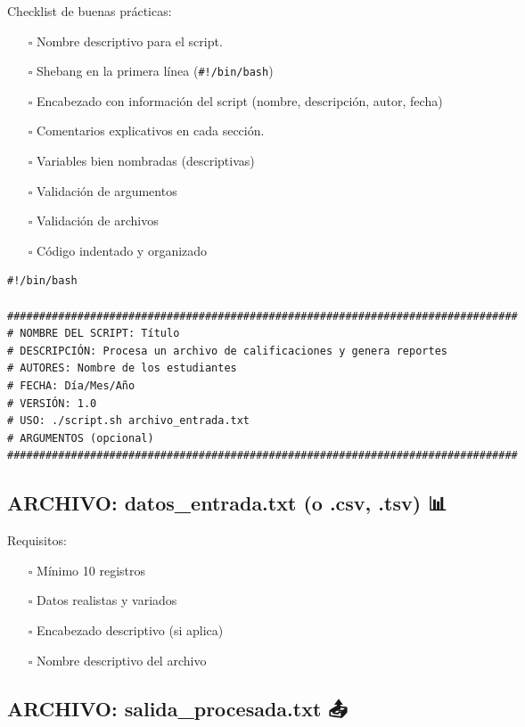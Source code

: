 \documentclass[
  spanish,
  12pt,
  letterpaper,
  DIV=11,
  numbers=noendperiod]{scrreprt}
\providecommand{\tightlist}{%
  \setlength{\itemsep}{0pt}\setlength{\parskip}{0pt}}
\begin{document}
Checklist de buenas prácticas:

\begin{itemize}
\tightlist
\item[$\square$]
  Nombre descriptivo para el script.
\item[$\square$]
  Shebang en la primera línea (\texttt{\#!/bin/bash})
\item[$\square$]
  Encabezado con información del script (nombre, descripción, autor,
  fecha)
\item[$\square$]
  Comentarios explicativos en cada sección.
\item[$\square$]
  Variables bien nombradas (descriptivas)
\item[$\square$]
  Validación de argumentos
\item[$\square$]
  Validación de archivos
\item[$\square$]
  Código indentado y organizado
\end{itemize}

\begin{verbatim}
#!/bin/bash

################################################################################
# NOMBRE DEL SCRIPT: Título
# DESCRIPCIÓN: Procesa un archivo de calificaciones y genera reportes
# AUTORES: Nombre de los estudiantes
# FECHA: Día/Mes/Año
# VERSIÓN: 1.0
# USO: ./script.sh archivo_entrada.txt
# ARGUMENTOS (opcional)
################################################################################
\end{verbatim}

\subsection{ARCHIVO: datos\_entrada.txt (o .csv, .tsv)
📊}\label{archivo-datos_entrada.txt-o-.csv-.tsv}

Requisitos:

\begin{itemize}
\tightlist
\item[$\square$]
  Mínimo 10 registros
\item[$\square$]
  Datos realistas y variados
\item[$\square$]
  Encabezado descriptivo (si aplica)
\item[$\square$]
  Nombre descriptivo del archivo
\end{itemize}

\subsection{ARCHIVO: salida\_procesada.txt
📤}\label{archivo-salida_procesada.txt}
\end{document}

